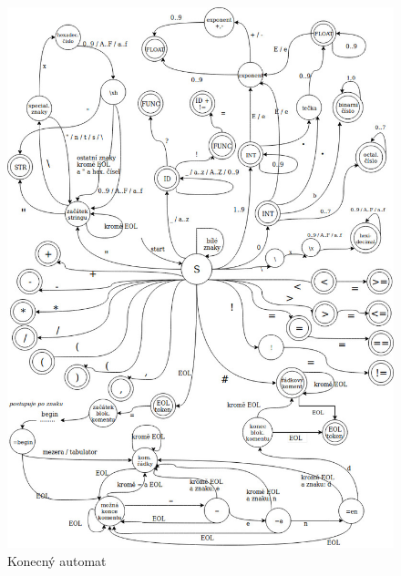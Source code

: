\documentclass[11pt, a4paper]{article}
\begin{document}
\begin{figure}[ht]
\begin{center}
\includegraphics[scale=0.58]{KA.jpg}
\caption{Konecný automat}
\end{center}
\end{figure}
\end{document}
